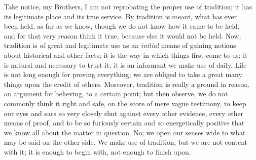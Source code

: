 Take notice, my Brothers, I am not reprobating the
proper use of tradition; it has its legitimate place and
its true service. By tradition is meant, what has ever
been held, as far as we know, though we do not know how
it came to be held, and for that very reason think it
true, because else it would not be held. Now, tradition
is of great and legitimate use as an \emph{initial}
means of gaining notions about historical and other
facts; it is the way in which things first come to us; it
is natural and necessary to trust it; it is an informant
we make use of daily. Life is not long enough for proving
everything; we are obliged to take a great many things
upon the credit of others. Moreover, tradition is really
a ground in reason, an argument for believing, to a
certain point; but then observe, we do not commonly think
it right and safe, on the score of mere vague testimony,
to keep our eyes and ears so very closely shut against
every other evidence, every other means of proof, and to
be so furiously certain and so energetically positive
that we know all about the matter in question. No; we
open our senses wide to what may be said on the other
side. We make use of tradition, but we are not content
with it; it is enough to begin with, not enough to finish
upon.

